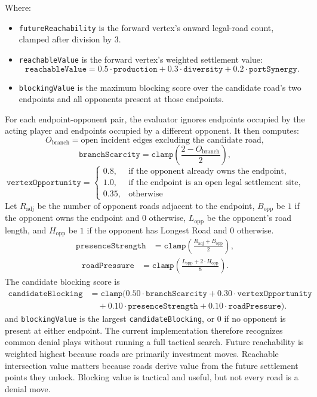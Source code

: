 \documentclass[letter,  12 pt]{article}
\begin{document}
Where:
\begin{itemize}
    \item \texttt{futureReachability} is the forward vertex's onward legal-road count, clamped after division by $3$.
    \item \texttt{reachableValue} is the forward vertex's weighted settlement value:
    \[
    \texttt{reachableValue}
    = 0.5 \cdot \texttt{production}
    + 0.3 \cdot \texttt{diversity}
    + 0.2 \cdot \texttt{portSynergy}.
    \]
    \item \texttt{blockingValue} is the maximum blocking score over the candidate road's two endpoints and all opponents present at those endpoints.
\end{itemize}
For each endpoint-opponent pair, the evaluator ignores endpoints occupied by the acting player and endpoints occupied by a different opponent. It then computes:
\[
O_{\text{branch}} =
\text{open incident edges excluding the candidate road},
\]
\[
\texttt{branchScarcity}
= \texttt{clamp}\left(\frac{2 - O_{\text{branch}}}{2}\right),
\]
\[
\texttt{vertexOpportunity} =
\begin{cases}
0.8, & \text{if the opponent already owns the endpoint},\\
1.0, & \text{if the endpoint is an open legal settlement site},\\
0.35, & \text{otherwise}
\end{cases}
\]
Let $R_{\text{adj}}$ be the number of opponent roads adjacent to the endpoint, $B_{\text{opp}}$ be $1$ if the opponent owns the endpoint and $0$ otherwise, $L_{\text{opp}}$ be the opponent's road length, and $H_{\text{opp}}$ be $1$ if the opponent has Longest Road and $0$ otherwise.
\[
\begin{aligned}
\texttt{presenceStrength}
&= \texttt{clamp}\left(
\frac{R_{\text{adj}} + B_{\text{opp}}}{2}
\right),
\end{aligned}
\]
\[
\begin{aligned}
\texttt{roadPressure}
&= \texttt{clamp}\left(
\frac{L_{\text{opp}} + 2 \cdot H_{\text{opp}}}{8}
\right).
\end{aligned}
\]
The candidate blocking score is
\[
\begin{aligned}
\texttt{candidateBlocking}
&= \texttt{clamp}(
0.50 \cdot \texttt{branchScarcity}
+ 0.30 \cdot \texttt{vertexOpportunity} \\
&\quad + 0.10 \cdot \texttt{presenceStrength}
+ 0.10 \cdot \texttt{roadPressure}).
\end{aligned}
\]
and \texttt{blockingValue} is the largest \texttt{candidateBlocking}, or $0$ if no opponent is present at either endpoint.
The current implementation therefore recognizes common denial plays without running a full tactical search.
Future reachability is weighted highest because roads are primarily investment moves. Reachable intersection value matters because roads derive value from the future settlement points they unlock. Blocking value is tactical and useful, but not every road is a denial move.
\end{document}
